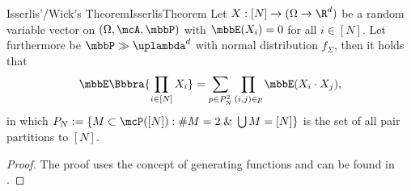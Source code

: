 \begin{msat}{Isserlis'/Wick's Theorem}{IsserlisTheorem}
    Let $X:[N]\to(\Omega\to\R^d)$ be a random variable vector on $(\Omega,\mcA,\mbbP)$ with $\mbbE(X_i) = 0$ for all $i\in[N]$. Let furthermore be $\mbbP\gg\uplambda^d$ with normal distribution $f_{\Sigma}$, then it holds that 
    \[
        \mbbE\Bbbra{
            \prod_{i\in[N]}X_i
        } = \sum_{p\in P_N^2}\prod_{(i,j)\in p}\mbbE(X_i\cdot X_j),
    \]
    in which $P_N:=\{M\subset\mcP([N]):\#M = 2\;\&\;\bigcup M = [N]\}$ is the set of all pair partitions to $[N]$.
\end{msat}
\begin{proof}
    The proof uses the concept of generating functions and can be found in \cite{skript:GaussCalc}.
\end{proof}